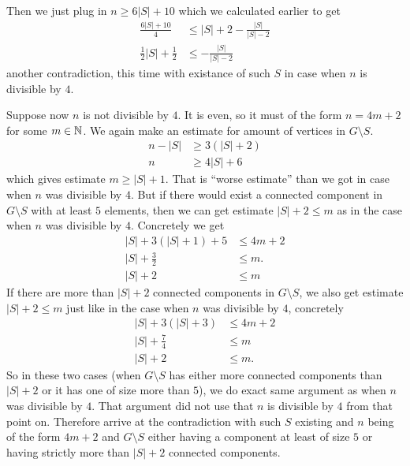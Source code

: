 \begin{exercise}{4}
\begin{itemize}
        Then we just plug in $n \geq 6 |S| + 10$ which we calculated earlier to get
        \begin{align*}
            \frac{6|S| + 10}{4} &\leq |S| + 2 - \frac{|S|}{|S| - 2} \\
            \frac{1}{2}|S| + \frac{1}{2} &\leq - \frac{|S|}{|S| - 2}
        \end{align*}
        another contradiction, this time with existance of such $S$ in case when
        $n$ is divisible by $4$.

        Suppose now $n$ is not divisible by $4$. It is even, so it must of the
        form $n = 4m + 2$ for some $m \in \mathbb{N}$.
        We again make an estimate for amount of vertices in $G \setminus S$.
        \begin{align*}
            n - |S| &\geq 3(|S| + 2) \\
            n &\geq 4|S| + 6
        \end{align*}
        which gives estimate $m \geq |S| + 1$. That is ``worse estimate'' than
        we got in case when $n$ was divisible by $4$. But if there would exist a
        connected component in $G \setminus S$ with at least $5$ elements, then
        we can get estimate $|S| + 2 \leq m$ as in the case when $n$ was
        divisible by $4$. Concretely we get
        \begin{align*}
            |S| + 3 (|S| + 1) + 5 &\leq 4m + 2 \\
            |S| + \frac{3}{2} &\leq m. \\
            |S| + 2 &\leq m
        \end{align*}
        If there are more than $|S| + 2$ connected components in $G \setminus
        S$, we also get estimate $|S| + 2 \leq m$ just like in the case when $n$
        was divisible by $4$, concretely
        \begin{align*}
            |S| + 3 (|S| + 3) &\leq 4m + 2 \\
            |S| + \frac{7}{4} &\leq m \\
            |S| + 2 &\leq m.
        \end{align*}
        So in these two cases (when $G \setminus S$ has either more connected
        components than $|S| + 2$ or it has one of size more than $5$), we do
        exact same argument as when $n$ was divisible by $4$. That argument did
        not use that $n$ is divisible by $4$ from that point on. Therefore
        arrive at the contradiction with such $S$ existing and $n$ being of the
        form $4m + 2$ and $G \setminus S$ either having a component at least of
        size $5$ or having strictly more than $|S| + 2$ connected components.


\end{itemize}
\end{exercise}

